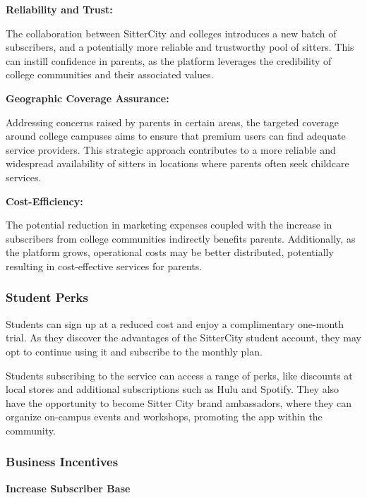 \documentclass[12pt]{article}
\begin{document}
\textbf{Reliability and Trust:}

The collaboration between SitterCity and colleges introduces a new batch
of subscribers, and a potentially more reliable and trustworthy pool of
sitters. This can instill confidence in parents, as the platform
leverages the credibility of college communities and their associated
values.

\textbf{Geographic Coverage Assurance:}

Addressing concerns raised by parents in certain areas, the targeted
coverage around college campuses aims to ensure that premium users can
find adequate service providers. This strategic approach contributes to
a more reliable and widespread availability of sitters in locations
where parents often seek childcare services.

\textbf{Cost-Efficiency:}

The potential reduction in marketing expenses coupled with the increase
in subscribers from college communities indirectly benefits parents.
Additionally, as the platform grows, operational costs may be better
distributed, potentially resulting in cost-effective services for
parents.

\hypertarget{student-perks}{%
\subsubsection{\texorpdfstring{\textbf{Student
Perks}}{Student Perks}}\label{student-perks}}

Students can sign up at a reduced cost and enjoy a complimentary
one-month trial. As they discover the advantages of the SitterCity
student account, they may opt to continue using it and subscribe to the
monthly plan.~

Students subscribing to the service can access a range of perks, like
discounts at local stores and additional subscriptions such as Hulu and
Spotify. They also have the opportunity to become Sitter City brand
ambassadors, where they can organize on-campus events and workshops,
promoting the app within the community.~

\hypertarget{business-incentives}{%
\subsubsection{\texorpdfstring{\textbf{Business
Incentives}}{Business Incentives}}\label{business-incentives}}

\textbf{Increase Subscriber Base}
\end{document}
